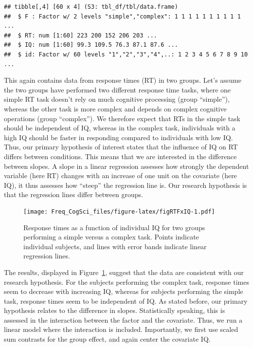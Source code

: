 \documentclass[12pt,]{krantz}
\begin{document}
\begin{verbatim}
## tibble[,4] [60 x 4] (S3: tbl_df/tbl/data.frame)
##  $ F : Factor w/ 2 levels "simple","complex": 1 1 1 1 1 1 1 1 1 1 ...
##  $ RT: num [1:60] 223 200 152 206 203 ...
##  $ IQ: num [1:60] 99.3 109.5 76.3 87.1 87.6 ...
##  $ id: Factor w/ 60 levels "1","2","3","4",..: 1 2 3 4 5 6 7 8 9 10 ...
\end{verbatim}

This again contains data from response times (RT) in two groups. Let's assume the two groups have performed two different response time tasks, where one simple RT task doesn't rely on much cognitive processing (group ``simple''), whereas the other task is more complex and depends on complex cognitive operations (group ``complex''). We therefore expect that RTs in the simple task should be independent of IQ, whereas in the complex task, individuals with a high IQ should be faster in responding compared to individuals with low IQ. Thus, our primary hypothesis of interest states that the influence of IQ on RT differs between conditions. This means that we are interested in the difference between slopes. A slope in a linear regression assesses how strongly the dependent variable (here RT) changes with an increase of one unit on the covariate (here IQ), it thus assesses how ``steep'' the regression line is. Our research hypothesis is that the regression lines differ between groups.

\begin{figure}
\centering
\texttt{[image: Freq\_CogSci\_files/figure-latex/figRTFxIQ-1.pdf]}
\caption{\label{fig:figRTFxIQ}Response times as a function of individual IQ for two groups performing a simple versus a complex task. Points indicate individual subjects, and lines with error bands indicate linear regression lines.}
\end{figure}

The results, displayed in Figure~\ref{fig:figRTFxIQ}, suggest that the data are consistent with our research hypothesis. For the subjects performing the complex task, response times seem to decrease with increasing IQ, whereas for subjects performing the simple task, response times seem to be independent of IQ. As stated before, our primary hypothesis relates to the difference in slopes. Statistically speaking, this is assessed in the interaction between the factor and the covariate. Thus, we run a linear model where the interaction is included. Importantly, we first use scaled sum contrasts for the group effect, and again center the covariate IQ.
\end{document}
